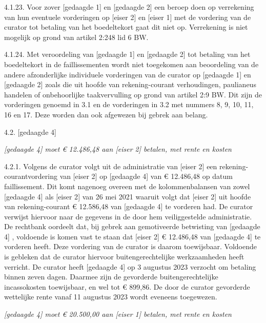 \documentclass[
  dutch,
  a4paper,
]{article}
\begin{document}
4.1.23. Voor zover {[}gedaagde 1{]} en {[}gedaagde 2{]} een beroep doen op verrekening van hun eventuele vorderingen op {[}eiser 2{]} en {[}eiser 1{]} met de vordering van de curator tot betaling van het boedeltekort gaat dit niet op. Verrekening is niet mogelijk op grond van artikel 2:248 lid 6 BW.

4.1.24. Met veroordeling van {[}gedaagde 1{]} en {[}gedaagde 2{]} tot betaling van het boedeltekort in de faillissementen wordt niet toegekomen aan beoordeling van de andere afzonderlijke individuele vorderingen van de curator op {[}gedaagde 1{]} en {[}gedaagde 2{]} zoals die uit hoofde van rekening-courant verhoudingen, paulianeus handelen of onbehoorlijke taakvervulling op grond van artikel 2:9 BW. Dit zijn de vorderingen genoemd in 3.1 en de vorderingen in 3.2 met nummers 8, 9, 10, 11, 16 en 17. Deze worden dan ook afgewezen bij gebrek aan belang.

4.2. {[}gedaagde 4{]}

\emph{{[}gedaagde 4{]} moet € 12.486,48 aan {[}eiser 2{]} betalen, met rente en kosten}

4.2.1. Volgens de curator volgt uit de administratie van {[}eiser 2{]} een rekening-courantvordering van {[}eiser 2{]} op {[}gedaagde 4{]} van € 12.486,48 op datum faillissement. Dit komt nagenoeg overeen met de kolommenbalansen van zowel {[}gedaagde 4{]} als {[}eiser 2{]} van 26 mei 2021 waaruit volgt dat {[}eiser 2{]} uit hoofde van rekening-courant € 12.586,48 van {[}gedaagde 4{]} te vorderen had. De curator verwijst hiervoor naar de gegevens in de door hem veiliggestelde administratie. De rechtbank oordeelt dat, bij gebrek aan gemotiveerde betwisting van {[}gedaagde 4{]} , voldoende is komen vast te staan dat {[}eiser 2{]} € 12.486,48 van {[}gedaagde 4{]} te vorderen heeft. Deze vordering van de curator is daarom toewijsbaar. Voldoende is gebleken dat de curator hiervoor buitengerechtelijke werkzaamheden heeft verricht. De curator heeft {[}gedaagde 4{]} op 3 augustus 2023 verzocht om betaling binnen zeven dagen. Daarmee zijn de gevorderde buitengerechtelijke incassokosten toewijsbaar, en wel tot € 899,86. De door de curator gevorderde wettelijke rente vanaf 11 augustus 2023 wordt eveneens toegewezen.

\emph{{[}gedaagde 4{]} moet € 20.500,00 aan {[}eiser 1{]} betalen, met rente en kosten}
\end{document}
